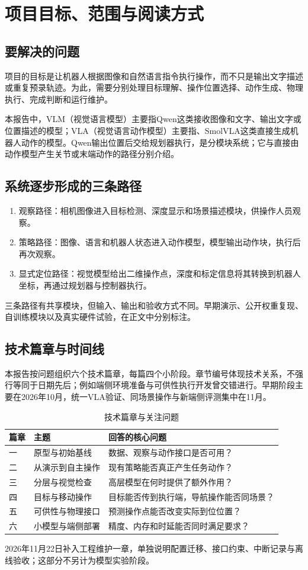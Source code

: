 \chapter{项目目标、范围与阅读方式}
\section{要解决的问题}
项目的目标是让机器人根据图像和自然语言指令执行操作，而不只是输出文字描述或重复预录轨迹。为此，需要分别处理目标理解、操作位置选择、动作生成、物理执行、完成判断和运行维护。

本报告中，VLM（视觉语言模型）主要指Qwen这类接收图像和文字、输出文字或位置描述的模型；VLA（视觉语言动作模型）主要指\pifive{}、SmolVLA这类直接生成机器人动作的模型。Qwen输出位置后交给规划器执行，是分模块系统；它与直接由动作模型产生关节或末端动作的路径分别介绍。
\section{系统逐步形成的三条路径}
\begin{enumerate}
\item 观察路径：相机图像进入目标检测、深度显示和场景描述模块，供操作人员观察。
\item 策略路径：图像、语言和机器人状态进入动作模型，模型输出动作块，执行后再次观察。
\item 显式定位路径：视觉模型给出二维操作点，深度和标定信息将其转换到机器人坐标，再通过规划器与控制器执行。
\end{enumerate}
三条路径有共享模块，但输入、输出和验收方式不同。早期演示、公开权重复现、自训练模块以及真实硬件试验，在正文中分别标注。
\section{技术篇章与时间线}
本报告按问题组织六个技术篇章，每篇四个小阶段。章节编号体现技术关系，不强行等同于日期先后；例如端侧环境准备与可供性执行开发曾交错进行。早期阶段主要在2026年10月，统一VLA验证、同场景操作与新端侧评测集中在11月。
\begin{table}[htbp]\centering\begin{tabular}{p{.10\linewidth}p{.31\linewidth}p{.49\linewidth}}
\toprule 篇章 & 主题 & 回答的核心问题\\\midrule
一 & 原型与初始基线 & 数据、观察与动作接口是否可用？\\
二 & 从演示到自主操作 & 现有策略能否真正产生任务动作？\\
三 & 分层与视觉检查 & 高层模型在何时提供了额外作用？\\
四 & 目标与移动操作 & 目标能否传到执行端，导航操作能否同场景？\\
五 & 可供性与物理接口 & 预测操作点能否改变实际到位位置？\\
六 & 小模型与端侧部署 & 精度、内存和时延能否同时满足要求？\\\bottomrule
\end{tabular}\caption{技术篇章与关注问题}\end{table}
2026年11月22日补入工程维护一章，单独说明配置迁移、接口约束、中断记录与离线验收；这部分不另计为模型实验阶段。
